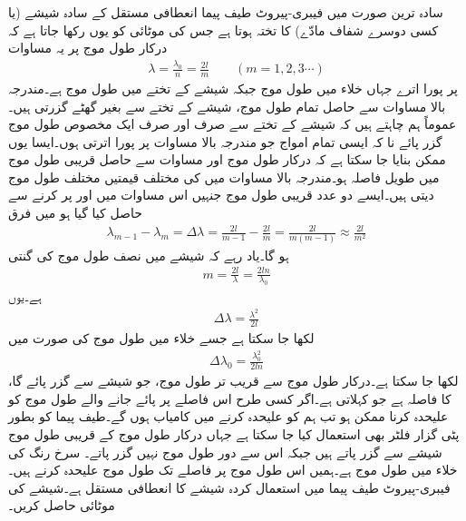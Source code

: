 سادہ ترین صورت میں فیبری-پیروٹ طیف پیما  انعطافی مستقل کے  سادہ شیشے (یا کسی دوسرے شفاف مادّے) کا تختہ ہوتا ہے جس کی موٹائی  کو یوں رکھا جاتا ہے کہ درکار طول موج پر یہ مساوات 
\begin{align}\label{مساوات_مستوی_فیبری_پیروٹ_الف}
\lambda=\frac{\lambda_0}{n}=\frac{2l}{m} \quad \quad (m=1,2,3\cdots)
\end{align}
 پر پورا اترے جہاں خلاء میں طول موج  جبکہ شیشے کے تختے میں طول موج  ہے۔مندرجہ بالا مساوات سے حاصل تمام طول موج، شیشے کے تختے سے بغیر گھٹے گزرتی ہیں۔عموماً ہم چاہتے ہیں کہ شیشے کے تختے سے صرف اور صرف ایک مخصوص طول موج گزر پائے نا کہ ایسی تمام امواج جو مندرجہ بالا مساوات پر پورا اترتی ہوں۔ایسا یوں ممکن بنایا جا سکتا ہے کہ درکار طول موج اور مساوات  سے حاصل قریبی طول موج میں طویل فاصلہ ہو۔مندرجہ بالا مساوات میں  کی مختلف قیمتیں مختلف طول موج دیتی ہیں۔ایسے دو عدد قریبی طول موج جنہیں اس مساوات میں   اور  پر کرنے سے حاصل کیا گیا ہو میں فرق 
\begin{align}
\lambda_{m-1}-\lambda_m=\Delta \lambda=\frac{2l}{m-1}-\frac{2l}{m}=\frac{2l}{m(m-1)} \approx \frac{2l}{m^2}
\end{align}
ہو گا۔یاد رہے کہ  شیشے میں نصف طول موج کی گنتی
\begin{align}
m=\frac{2l}{\lambda}=\frac{2ln}{\lambda_0}
\end{align}
ہے۔یوں
\begin{align}
\Delta \lambda=\frac{\lambda^2}{2l}
\end{align}
لکھا جا سکتا ہے جسے خلاء میں طول موج  کی صورت میں
\begin{align}
\Delta \lambda_0=\frac{\lambda_0^2}{2ln}
\end{align}
لکھا جا سکتا ہے۔درکار طول موج  سے قریب تر طول موج، جو شیشے سے گزر پائے گا، کا فاصلہ  ہے جو  کہلاتی ہے۔اگر کسی طرح اس فاصلے پر پائے جانے والے  طول موج کو علیحدہ کرنا ممکن ہو تب ہم  کو علیحدہ کرنے میں کامیاب ہوں گے۔طیف پیما کو بطور پٹی گزار فلٹر بھی استعمال کیا جا سکتا ہے جہاں درکار طول موج کے قریبی طول موج شیشے سے گزر پاتے ہیں جبکہ اس سے دور طول موج نہیں گزر پاتے۔
سرخ رنگ کی خلاء میں طول موج  ہے۔ہمیں اس طول موج پر  فاصلے تک طول موج علیحدہ کرنے ہیں۔فیبری-پیروٹ طیف پیما میں استعمال کردہ شیشے کا انعطافی مستقل  ہے۔شیشے کی موٹائی حاصل کریں۔


